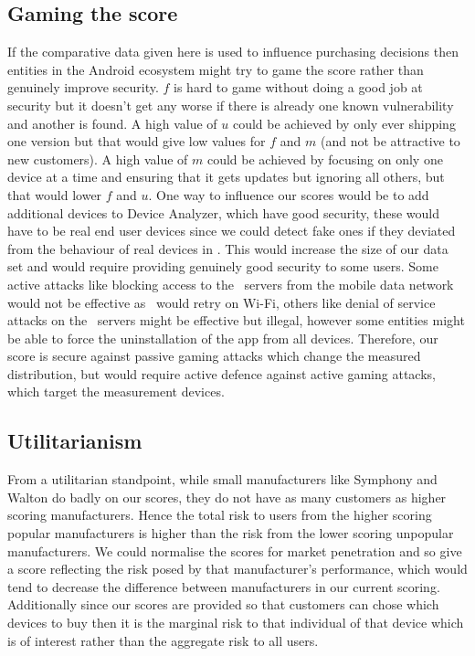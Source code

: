 \subsection{Gaming the score}
If the comparative data given here is used to influence purchasing decisions then entities in the Android ecosystem might try to game the score rather than genuinely improve security.
$f$ is hard to game without doing a good job at security but it doesn't get any worse if there is already one known vulnerability and another is found.
A high value of $u$ could be achieved by only ever shipping one version but that would give low values for $f$ and $m$ (and not be attractive to new customers).
A high value of $m$ could be achieved by focusing on only one device at a time and ensuring that it gets updates but ignoring all others, but that would lower $f$ and $u$.
One way to influence our scores would be to add additional devices to Device Analyzer, which have good security, these would have to be real end user devices since we could detect fake ones if they deviated from the behaviour of real devices in \da.
This would increase the size of our data set and would require providing genuinely good security to some users.
Some active attacks like blocking access to the \da\ servers from the mobile data network would not be effective as \da\ would retry on Wi-Fi, others like denial of service attacks on the \da\ servers might be effective but illegal, however some entities might be able to force the uninstallation of the app from all devices.
Therefore, our score is secure against passive gaming attacks which change the measured distribution, but would require active defence against active gaming attacks, which target the measurement devices.

\subsection{Utilitarianism}
From a utilitarian standpoint, while small manufacturers like Symphony and Walton do badly on our scores, they do not have as many customers as higher scoring manufacturers.
Hence the total risk to users from the higher scoring popular manufacturers is higher than the risk from the lower scoring unpopular manufacturers.
We could normalise the scores for market penetration and so give a score reflecting the risk posed by that manufacturer's performance, which would tend to decrease the difference between manufacturers in our current scoring.
Additionally since our scores are provided so that customers can chose which devices to buy then it is the marginal risk to that individual of that device which is of interest rather than the aggregate risk to all users.